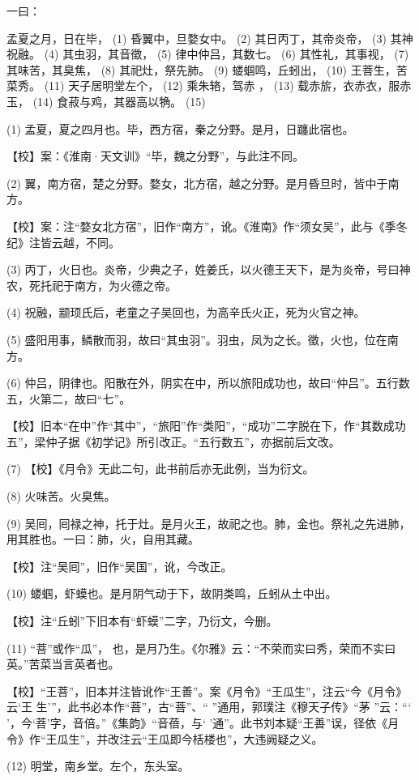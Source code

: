 \documentclass[12pt,UTF8]{ctexbook}
\begin{document}
一曰：

孟夏之月，日在毕， (1) 昏翼中，旦婺女中。 (2) 其日丙丁，其帝炎帝， (3) 其神祝融。 (4) 其虫羽，其音徵， (5) 律中仲吕，其数七。 (6) 其性礼，其事视， (7) 其味苦，其臭焦， (8) 其祀灶，祭先肺。 (9) 蝼蝈鸣，丘蚓出， (10) 王菩生，苦菜秀。 (11) 天子居明堂左个， (12) 乘朱辂，驾赤 ， (13) 载赤旂，衣赤衣，服赤玉， (14) 食菽与鸡，其器高以觕。 (15)

(1) 孟夏，夏之四月也。毕，西方宿，秦之分野。是月，日躔此宿也。

【校】案：《淮南·天文训》“毕，魏之分野”，与此注不同。

(2) 翼，南方宿，楚之分野。婺女，北方宿，越之分野。是月昏旦时，皆中于南方。

【校】案：注“婺女北方宿”，旧作“南方”，讹。《淮南》作“须女吴”，此与《季冬纪》注皆云越，不同。

(3) 丙丁，火日也。炎帝，少典之子，姓姜氏，以火德王天下，是为炎帝，号曰神农，死托祀于南方，为火德之帝。

(4) 祝融，颛顼氏后，老童之子吴回也，为高辛氏火正，死为火官之神。

(5) 盛阳用事，鳞散而羽，故曰“其虫羽”。羽虫，凤为之长。徵，火也，位在南方。

(6) 仲吕，阴律也。阳散在外，阴实在中，所以旅阳成功也，故曰“仲吕”。五行数五，火第二，故曰“七”。

【校】旧本“在中”作“其中”，“旅阳”作“类阳”，“成功”二字脱在下，作“其数成功五”，梁仲子据《初学记》所引改正。“五行数五”，亦据前后文改。

(7) 【校】《月令》无此二句，此书前后亦无此例，当为衍文。

(8) 火味苦。火臭焦。

(9) 吴囘，囘禄之神，托于灶。是月火王，故祀之也。肺，金也。祭礼之先进肺，用其胜也。一曰：肺，火，自用其藏。

【校】注“吴囘”，旧作“吴国”，讹，今改正。

(10) 蝼蝈，虾蟆也。是月阴气动于下，故阴类鸣，丘蚓从土中出。

【校】注“丘蚓”下旧本有“虾蟆”二字，乃衍文，今删。

(11) “菩”或作“瓜”， 也，是月乃生。《尔雅》云：“不荣而实曰秀，荣而不实曰英。”苦菜当言英者也。

【校】“王菩”，旧本并注皆讹作“王善”。案《月令》“王瓜生”，注云“今《月令》云‘王 生’”，此书必本作“菩”，古“菩”、“ ”通用，郭璞注《穆天子传》“茅 ”云：“‘ ’，今‘菩’字，音倍。”《集韵》“音蓓，与‘ ’通”。此书刘本疑“王善”误，径依《月令》作“王瓜生”，并改注云“王瓜即今栝楼也”，大违阙疑之义。

(12) 明堂，南乡堂。左个，东头室。
\end{document}
